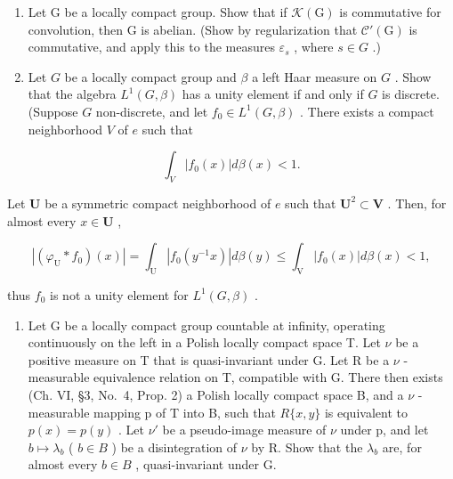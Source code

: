 \begin{enumerate}
\def\labelenumi{\arabic{enumi})}
\setcounter{enumi}{5}
\item
  Let G be a locally compact group. Show that if \(\mathcal{K}(\mathrm{G})\) is commutative for convolution, then G is abelian. (Show by regularization that \(\mathcal{C}'(\mathrm{G})\) is commutative, and apply this to the measures \(\varepsilon_{s}\) , where \(s \in G\) .)
\item
  Let \(G\) be a locally compact group and \(\beta\) a left Haar measure on \(G\) . Show that the algebra \(L^1(G, \beta)\) has a unity element if and only if \(G\) is discrete. (Suppose \(G\) non-discrete, and let \(f_0 \in L^1(G, \beta)\) . There exists a compact neighborhood \(V\) of \(e\) such that
\end{enumerate}

\[
\int_ {V} | f _ {0} (x) | d \beta (x) <   1.
\]

Let \(\mathbf{U}\) be a symmetric compact neighborhood of \(e\) such that \(\mathbf{U}^2 \subset \mathbf{V}\) . Then, for almost every \(x \in \mathbf{U}\) ,

\[
\left| \left(\varphi_ {\mathrm{U}} * f _ {0}\right) (x) \right| = \int_ {\mathrm{U}} \left| f _ {0} \left(y ^ {- 1} x\right) \right| d \beta (y) \leqslant \int_ {\mathrm{V}} \left| f _ {0} (x) \right| d \beta (x) <   1,
\]

thus \(f_0\) is not a unity element for \(L^1(G, \beta)\) .

\begin{enumerate}
\def\labelenumi{\arabic{enumi})}
\setcounter{enumi}{7}
\tightlist
\item
  Let G be a locally compact group countable at infinity, operating continuously on the left in a Polish locally compact space T. Let \(\nu\) be a positive measure on T that is quasi-invariant under G. Let R be a \(\nu\) -measurable equivalence relation on T, compatible with G. There then exists (Ch. VI, §3, No.~4, Prop. 2) a Polish locally compact space B, and a \(\nu\) -measurable mapping p of T into B, such that \(R\{x,y\}\) is equivalent to \(p(x)=p(y)\) . Let \(\nu'\) be a pseudo-image measure of \(\nu\) under p, and let \(b\mapsto\lambda_{b}\) ( \(b\in B\) ) be a disintegration of \(\nu\) by R. Show that the \(\lambda_{b}\) are, for almost every \(b\in B\) , quasi-invariant under G.
\end{enumerate}

